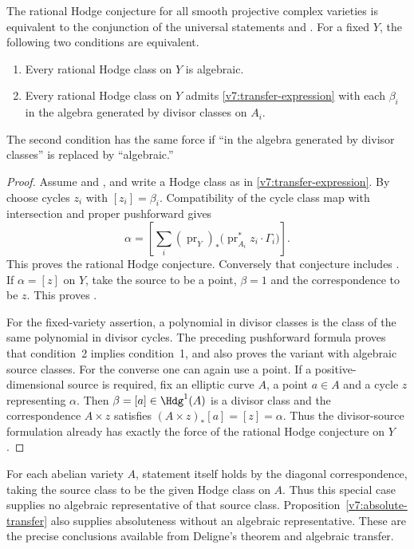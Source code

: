 \begin{proposition}\label{v7:equivalence-and-divisors}
The rational Hodge conjecture for all smooth projective complex varieties
is equivalent to the conjunction of the universal statements \Fii{} and
\Fiii{}.  For a fixed $Y$, the following two conditions are equivalent.
\begin{enumerate}
\item Every rational Hodge class on $Y$ is algebraic.
\item Every rational Hodge class on $Y$ admits
  \eqref{v7:transfer-expression} with each $\beta_i$ in the algebra
  generated by divisor classes on $A_i$.
\end{enumerate}
The second condition has the same force if ``in the algebra generated by
divisor classes'' is replaced by ``algebraic.''
\end{proposition}

\begin{proof}
Assume \Fii{} and \Fiii{}, and write a Hodge class as in
\eqref{v7:transfer-expression}.  By \Fii{} choose cycles $z_i$ with
$[z_i]=\beta_i$.  Compatibility of the cycle class map with intersection
and proper pushforward gives
\[
 \alpha=
 \left[\sum_i(\operatorname{pr}_Y)_*
    \bigl(\operatorname{pr}_{A_i}^*z_i\cdot\Gamma_i\bigr)\right].
\]
This proves the rational Hodge conjecture.  Conversely that conjecture
includes \Fii{}.  If $\alpha=[z]$ on $Y$, take the source to be a point,
$\beta=1$ and the correspondence to be $z$.  This proves \Fiii{}.

For the fixed-variety assertion, a polynomial in divisor classes is the
class of the same polynomial in divisor cycles.  The preceding
pushforward formula proves that condition~2 implies condition~1, and
also proves the variant with algebraic source classes.  For the converse
one can again use a point.  If a positive-dimensional source is required,
fix an elliptic curve $A$, a point $a\in A$ and a cycle $z$ representing
$\alpha$.  Then $\beta=[a]\in\Hdg^1(A)$ is a divisor class and the
correspondence $A\times z$ satisfies
$(A\times z)_*[a]=[z]=\alpha$.  Thus the divisor-source formulation
already has exactly the force of the rational Hodge conjecture on $Y$.
\end{proof}

For each abelian variety $A$, statement \Fiii{} itself holds by the
diagonal correspondence, taking the source class to be the given Hodge
class on $A$.  Thus this special case supplies no algebraic
representative of that source class.  Proposition~\ref{v7:absolute-transfer}
also supplies absoluteness without an algebraic representative.  These
are the precise conclusions available from Deligne's theorem and
algebraic transfer.

